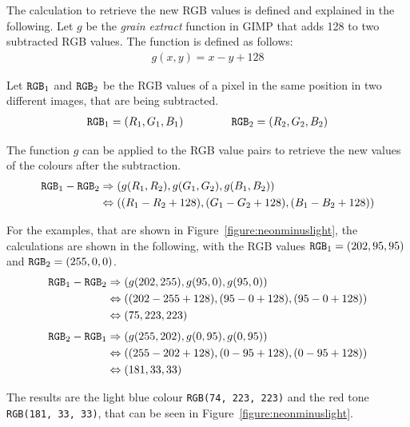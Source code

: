 \documentclass[../MasterThesis.tex]{subfiles}
\begin{document}
The calculation to retrieve the new RGB values is defined and explained in the following.
Let $g$ be the \textit{grain extract} function in GIMP that adds 128 to two subtracted RGB values. The function is defined as follows:
%
\begin{align*}
	g(x, y) = x - y + 128
\end{align*}

Let $\text{\texttt{RGB}}_1$ and $\text{\texttt{RGB}}_2$ be the RGB values of a pixel in the same position in two different images, that are being subtracted.
%
\begin{align*}
	\text{\texttt{RGB}}_1 = (R_1, G_1, B_1) \ \ \ \ \ \ \ \ \ \ \ \ \ 
	\text{\texttt{RGB}}_2 = (R_2, G_2, B_2)
\end{align*}

The function $g$ can be applied to the RGB value pairs to retrieve the new values of the colours after the subtraction.
%
\begin{align*}
	\text{\texttt{RGB}}_1 - \text{\texttt{RGB}}_2 & \Rightarrow (g(R_1, R_2), g(G_1, G_2), g(B_1, B_2)) \\
	 & \Leftrightarrow ((R_1 - R_2 + 128), (G_1 - G_2 + 128) , (B_1 - B_2 + 128)) 
\end{align*}


For the examples, that are shown in Figure~\ref{figure:neonminuslight}, the calculations are shown in the following, with the RGB values $\text{\texttt{RGB}}_1 = (202, 95, 95)$ and
$\text{\texttt{RGB}}_2 = (255, 0, 0)$.
%
\begin{align*}
	\text{\texttt{RGB}}_1 - \text{\texttt{RGB}}_2 & \Rightarrow (g(202, 255), g(95, 0), g(95, 0)) \\
	 & \Leftrightarrow ((202 - 255 + 128), (95 - 0 + 128) , (95 - 0 + 128)) \\
	 & \Leftrightarrow (75, 223, 223) 
\end{align*}
%
%
\begin{align*}
	\text{\texttt{RGB}}_2 - \text{\texttt{RGB}}_1 & \Rightarrow (g(255, 202), g(0, 95), g(0, 95)) \\
	 & \Leftrightarrow ((255 - 202 + 128), (0 - 95 + 128) , (0 - 95 + 128)) \\
	 & \Leftrightarrow (181, 33, 33) 
\end{align*}

The results are the light blue colour \texttt{RGB(74, 223, 223)} and the red tone \texttt{RGB(181, 33, 33)}, that can be seen in Figure~\ref{figure:neonminuslight}. 




















	
	
	
	
\end{document}
